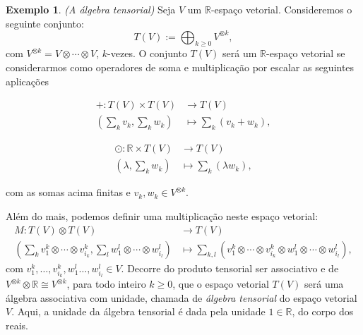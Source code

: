 \documentclass[twoside,openright,titlepage,numbers=noenddot,headinclude,  lineheaders footinclude=true,cleardoublepage=empty,
                                BCOR=5mm,paper=a4,fontsize=12pt ]{scrbook}
\theoremstyle{definition}
\newtheorem{exmp}{Exemplo}[section]
\begin{document}
\begin{exmp}
\textit{(A álgebra tensorial)} Seja $V$ um $\mathbb{R}$-espaço vetorial. Consideremos o seguinte conjunto:
\[ T(V) := \bigoplus_{k \geq 0} V^{\otimes k}, \]
com $V^{\otimes k} = V \otimes \cdots \otimes V$, $k$-vezes. O conjunto $T(V)$ será um $\mathbb{R}$-espaço vetorial se
considerarmos como operadores de soma e multiplicação por escalar as seguintes aplicações

\begin{minipage}{0.6\linewidth}
\centering
\begin{align*}
+: T(V) \times T(V) &\rightarrow T(V)\\
 \left(\sum_k v_k, \sum_k w_k \right) & \mapsto \sum_k (v_k + w_k),
\end{align*}
\end{minipage}%
\begin{minipage}{0.4\linewidth}
\begin{align*}
\odot: \mathbb{R} \times T(V) &\rightarrow T(V)\\
 \left(\lambda,  \sum_k w_k \right) & \mapsto \sum_k (\lambda w_k),
\end{align*}
\end{minipage}
com as somas acima finitas e $v_k, w_k \in V^{\otimes k}$.

Além do mais, podemos definir uma multiplicação neste espaço vetorial:
\begin{align*}
M: T(V) \otimes T(V) &\rightarrow T(V)\\
 \left(\sum_k v_1^k\otimes \cdots \otimes v_{i_k}^k, \sum_l w_1^l\otimes \cdots \otimes w_{i_l}^l \right)
 & \mapsto \sum_{k,l} (v_1^k\otimes \cdots \otimes v_{i_k}^k \otimes w_1^l\otimes \cdots \otimes w_{i_l}^l),
\end{align*}
com $v_1^k, \ldots, v_{i_k}^k, w_1^l \ldots, w_{i_l}^l \in V$. %
Decorre do produto tensorial ser associativo e de $V^{\otimes k} \otimes \mathbb{R} \cong V^{\otimes k}   $,
para todo inteiro $ k \geq 0$, que o espaço vetorial $T(V)$ será uma álgebra associativa com unidade, 
chamada de \textit{álgebra tensorial} do espaço vetorial $V$. 
Aqui, a unidade da álgebra tensorial é dada pela unidade $1 \in \mathbb{R}$, do corpo dos reais.
\end{exmp}
\end{document}
